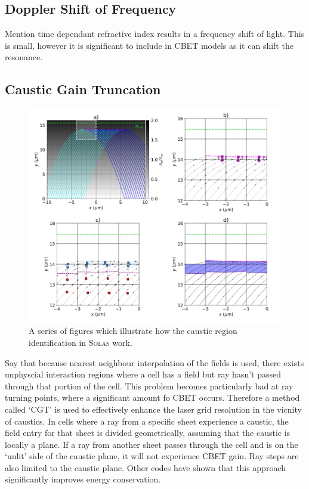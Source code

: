 \subsection{Doppler Shift of Frequency}%
\label{sec:SOLAS_doppler}

Mention time dependant refractive index results in a frequency shift of light.
This is small, however it is significant to include in CBET models as it can shift the resonance.

\subsection{Caustic Gain Truncation}

\begin{figure}[t!]
    \includegraphics[width=1.0\linewidth]{Numerics/Images/caustic_region_diagram.png}
    \centering
    \caption{A series of figures which illustrate how the caustic region identification in \textsc{Solas} work.}%
    \label{fig:SOLAS_caustic_region}
\end{figure}

Say that because nearest neighbour interpolation of the fields is used, there exists unphyscial interaction regions where a cell has a field but ray hasn't passed through that portion of the cell.
This problem becomes particularly bad at ray turning points, where a significant amount fo CBET occurs.
Therefore a method called `CGT' is used to effectively enhance the laser grid resolution in the vicnity of caustics.
In cells where a ray from a specific sheet experience a caustic, the field entry for that sheet is divided geometrically, assuming that the caustic is locally a plane.
If a ray from another sheet passes through the cell and is on the `unlit' side of the caustic plane, it will not experience CBET gain.
Ray steps are also limited to the caustic plane.
Other codes have shown that this approach significantly improves energy conservation.

